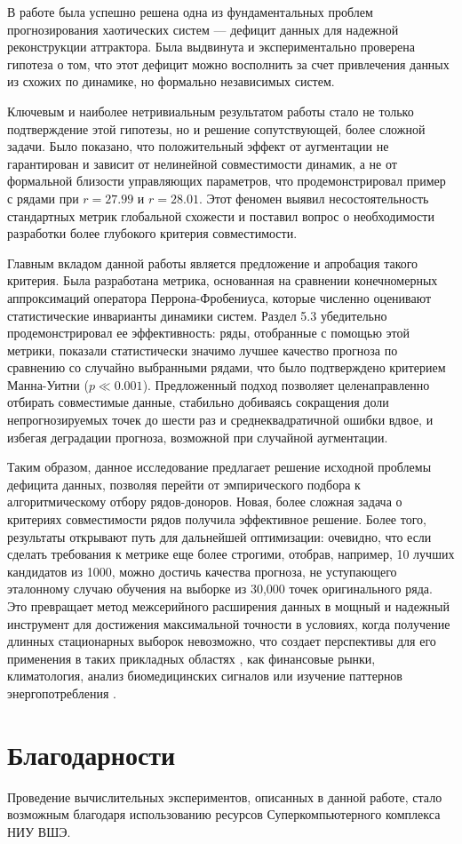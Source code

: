 \documentclass[a4paper,12pt]{extarticle}
\begin{document}
В работе была успешно решена одна из фундаментальных проблем прогнозирования хаотических
 систем — дефицит данных для надежной реконструкции аттрактора. Была выдвинута и
  экспериментально проверена гипотеза о том, что этот дефицит можно восполнить за 
  счет привлечения данных из схожих по динамике, но формально независимых систем.

Ключевым и наиболее нетривиальным результатом работы стало не только подтверждение
 этой гипотезы, но и решение сопутствующей, более сложной задачи. Было показано, что
  положительный эффект от аугментации не гарантирован и зависит от нелинейной совместимости динамик, а не от формальной близости управляющих параметров, что продемонстрировал пример с рядами при $r=27.99$ и $r=28.01$. Этот феномен выявил несостоятельность стандартных метрик глобальной схожести и поставил вопрос о необходимости разработки более глубокого критерия совместимости.

Главным вкладом данной работы является предложение и апробация такого критерия.
 Была разработана метрика, основанная на сравнении конечномерных аппроксимаций оператора
  Перрона-Фробениуса, которые численно оценивают статистические инварианты динамики систем.
   Раздел 5.3 убедительно продемонстрировал ее эффективность: ряды, отобранные с помощью
    этой метрики, показали статистически значимо лучшее качество прогноза по сравнению со 
    случайно выбранными рядами, что было подтверждено критерием Манна-Уитни ($p \ll 0.001$). 
    Предложенный подход позволяет целенаправленно отбирать совместимые данные, стабильно добиваясь
     сокращения доли непрогнозируемых точек до шести раз и среднеквадратичной ошибки вдвое, и избегая
      деградации прогноза, возможной при случайной аугментации.

Таким образом, данное исследование предлагает решение исходной проблемы дефицита данных, 
позволяя перейти от эмпирического подбора к алгоритмическому отбору рядов-доноров. Новая, более
  сложная задача о критериях совместимости рядов получила эффективное решение. Более того, результаты
   открывают путь для дальнейшей оптимизации: очевидно, что если сделать требования к метрике еще более
    строгими, отобрав, например, 10 лучших кандидатов из 1000, можно достичь качества прогноза, не
     уступающего эталонному случаю обучения на выборке из 30,000 точек оригинального ряда. Это превращает
      метод межсерийного расширения данных в мощный и надежный инструмент для достижения максимальной
       точности в условиях, когда получение длинных стационарных выборок невозможно,  что создает перспективы 
       для его применения в таких прикладных областях , как финансовые рынки, климатология,
 анализ биомедицинских сигналов или изучение паттернов энергопотребления \cite{PerezChacon2018}.
\section{Благодарности}
Проведение вычислительных экспериментов, описанных в данной работе, стало возможным благодаря использованию ресурсов Суперкомпьютерного комплекса НИУ ВШЭ.

\newpage
\printbibliography[title={Список использованных источников}]
\end{document}
